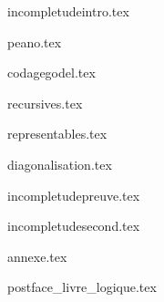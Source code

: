 \documentclass[10pt,twoside,openright]{report}
\begin{document}
{incompletudeintro.tex}

{peano.tex}

{codagegodel.tex}

{recursives.tex}

{representables.tex}

{diagonalisation.tex}

{incompletudepreuve.tex}

{incompletudesecond.tex}

	
\clearemptydoublepage

{annexe.tex}

{postface_livre_logique.tex}

\vfill

\end{document}

